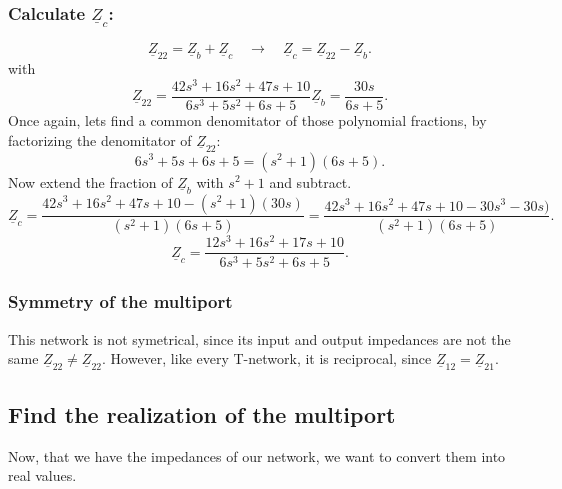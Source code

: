 \documentclass[a4paper]{article}
\begin{document}
\subsubsection*{Calculate $\underline{Z}_{c}$:}
\[
  \underline{Z}_{22} = \underline{Z}_{b} + \underline{Z}_{c} \quad \rightarrow \quad 
  \underline{Z}_{c} = \underline{Z}_{22}-\underline{Z}_{b}
.\] 
with
\[
  \underline{Z}_{22} = \frac{42s^3+16s^2+47s+10}{6s^3+5s^2+6s+5}
  \underline{Z}_{b} = \frac{30s}{6s+5} 
.\] 
Once again, lets find a common denomitator of those polynomial fractions, by factorizing the
denomitator of $\underline{Z}_{22}$:
\[
  6s^3 + 5s + 6s + 5 = (s^2 + 1)(6s + 5)
.\] 
Now extend the fraction of $\underline{Z}_{b}$ with $s^2 + 1$ and subtract.
\[
  \underline{Z}_{c} = \frac{42s^3+16s^2+47s+10-(s^2+1)(30s)}{(s^2+1)(6s+5)} =
  \frac{42s^3+16s^2+47s+10- 30s^3 - 30s)}{(s^2+1)(6s+5)}
.\] 
\[
  \underline{Z}_{c} = \frac{12s^3 + 16s^2 + 17s +10}{6s^3 + 5s^2 + 6s+ 5}
.\] 

\clearpage
\subsubsection*{Symmetry of the multiport}
This network is not symetrical, since its input and output impedances are not the same $
\underline{Z}_{22} \ne \underline{Z}_{22}$. However, like every T-network, it is reciprocal, since $\underline{Z}_{12} =
\underline{Z}_{21}$.
\subsection{Find the realization of the multiport}
Now, that we have the impedances of our network, we want to convert them into real values.
\end{document}
